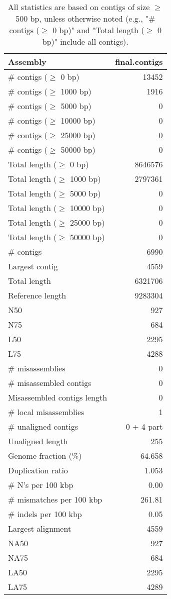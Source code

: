 \documentclass[12pt,a4paper]{article}
\begin{document}
\begin{table}[ht]
\begin{center}
\caption{All statistics are based on contigs of size $\geq$ 500 bp, unless otherwise noted (e.g., "\# contigs ($\geq$ 0 bp)" and "Total length ($\geq$ 0 bp)" include all contigs).}
\begin{tabular}{|l*{1}{|r}|}
\hline
Assembly & final.contigs \\ \hline
\# contigs ($\geq$ 0 bp) & 13452 \\ \hline
\# contigs ($\geq$ 1000 bp) & 1916 \\ \hline
\# contigs ($\geq$ 5000 bp) & 0 \\ \hline
\# contigs ($\geq$ 10000 bp) & 0 \\ \hline
\# contigs ($\geq$ 25000 bp) & 0 \\ \hline
\# contigs ($\geq$ 50000 bp) & 0 \\ \hline
Total length ($\geq$ 0 bp) & 8646576 \\ \hline
Total length ($\geq$ 1000 bp) & 2797361 \\ \hline
Total length ($\geq$ 5000 bp) & 0 \\ \hline
Total length ($\geq$ 10000 bp) & 0 \\ \hline
Total length ($\geq$ 25000 bp) & 0 \\ \hline
Total length ($\geq$ 50000 bp) & 0 \\ \hline
\# contigs & 6990 \\ \hline
Largest contig & 4559 \\ \hline
Total length & 6321706 \\ \hline
Reference length & 9283304 \\ \hline
N50 & 927 \\ \hline
N75 & 684 \\ \hline
L50 & 2295 \\ \hline
L75 & 4288 \\ \hline
\# misassemblies & 0 \\ \hline
\# misassembled contigs & 0 \\ \hline
Misassembled contigs length & 0 \\ \hline
\# local misassemblies & 1 \\ \hline
\# unaligned contigs & 0 + 4 part \\ \hline
Unaligned length & 255 \\ \hline
Genome fraction (\%) & 64.658 \\ \hline
Duplication ratio & 1.053 \\ \hline
\# N's per 100 kbp & 0.00 \\ \hline
\# mismatches per 100 kbp & 261.81 \\ \hline
\# indels per 100 kbp & 0.05 \\ \hline
Largest alignment & 4559 \\ \hline
NA50 & 927 \\ \hline
NA75 & 684 \\ \hline
LA50 & 2295 \\ \hline
LA75 & 4289 \\ \hline
\end{tabular}
\end{center}
\end{table}
\end{document}
